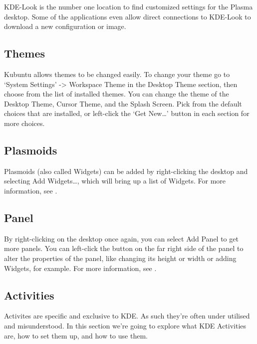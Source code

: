 \documentclass[letterpaper,10pt,english]{sphinxmanual}
\begin{document}
KDE-Look is the number one location to find customized settings for the  Plasma desktop. Some of the applications even allow direct connections to KDE-Look to download a new configuration or image.


\subsection{Themes}
\label{\detokenize{docs/basic:themes}}
Kubuntu allows themes to be changed easily. To change your theme go to ‘System Settings’ -\textgreater{} Workspace Theme in the Desktop Theme section, then choose from the list of installed themes. You can change the theme of the Desktop Theme, Cursor Theme, and the Splash Screen. Pick from the default choices that are installed, or left-click the ‘Get New…’ button in each section for more choices.


\subsection{Plasmoids}
\label{\detokenize{docs/basic:plasmoids}}
Plasmoids (also called Widgets) can be added by right-clicking the desktop and selecting Add Widgets…, which will bring up a list of Widgets. For more information, see .


\subsection{Panel}
\label{\detokenize{docs/basic:panel}}

By right-clicking on the desktop once again, you can select Add Panel to get more panels. You can left-click the button on the far right side of the panel to alter the properties of the panel, like changing its height or width or adding Widgets, for example. For more information, see .


\subsection{Activities}
\label{\detokenize{docs/basic:activities}}
Activites are specific and exclusive to KDE. As such they’re often under utilised and misunderstood. In this section we’re going to explore what KDE Activities are, how to set them up, and how to use them.
\end{document}
